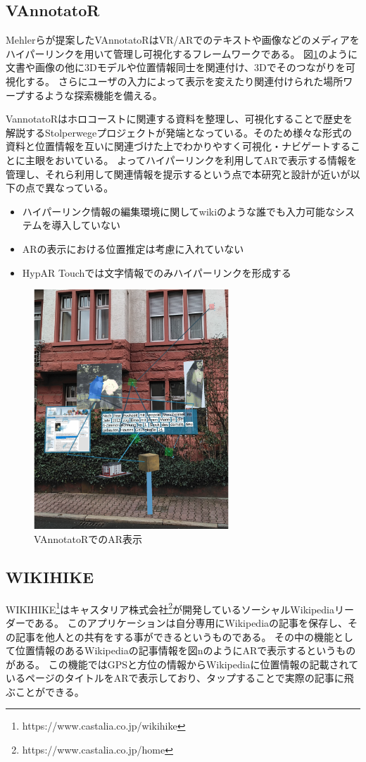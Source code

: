 \subsection{VAnnotatoR}
Mehlerらが提案したVAnnotatoR\cite{10.1145/3209542.3209572}はVR/ARでのテキストや画像などのメディアをハイパーリンクを用いて管理し可視化するフレームワークである。
図\ref{fig:VAnnotatoR}のように文書や画像の他に3Dモデルや位置情報同士を関連付け、3Dでそのつながりを可視化する。
さらにユーザの入力によって表示を変えたり関連付けられた場所ワープするような探索機能を備える。

VannotatoRはホロコーストに関連する資料を整理し、可視化することで歴史を解説するStolperwegeプロジェクトが発端となっている。そのため様々な形式の資料と位置情報を互いに関連づけた上でわかりやすく可視化・ナビゲートすることに主眼をおいている。
よってハイパーリンクを利用してARで表示する情報を管理し、それら利用して関連情報を提示するという点で本研究と設計が近いが以下の点で異なっている。
\begin{itemize} 
  \item ハイパーリンク情報の編集環境に関してwikiのような誰でも入力可能なシステムを導入していない
  \item ARの表示における位置推定は考慮に入れていない
  \item HypAR Touchでは文字情報でのみハイパーリンクを形成する
\end{itemize}

\begin{figure}[h]
  \centering 
  \includegraphics[height=90mm]{images/VAnnotatoR.png}
  \caption{VAnnotatoRでのAR表示} \label{fig:VAnnotatoR}
\end{figure}


\subsection{WIKIHIKE}
WIKIHIKE\footnote{\textsf{https://www.castalia.co.jp/wikihike}}はキャスタリア株式会社\footnote{\textsf{https://www.castalia.co.jp/home}}が開発しているソーシャルWikipediaリーダーである。
このアプリケーションは自分専用にWikipediaの記事を保存し、その記事を他人との共有をする事ができるというものである。
その中の機能として位置情報のあるWikipediaの記事情報を図nのようにARで表示するというものがある。
この機能ではGPSと方位の情報からWikipediaに位置情報の記載されているページのタイトルをARで表示しており、タップすることで実際の記事に飛ぶことができる。

